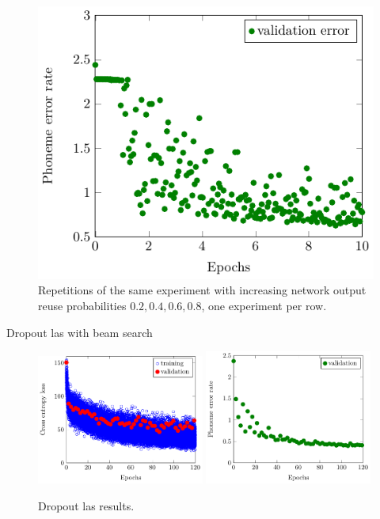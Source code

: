 \documentclass[10pt]{beamer}
\begin{document}
\begin{frame}
\begin{figure}
	\includegraphics[width=0.24\linewidth]{../tikz/LAS_no_reg_e10_p08_error}
	\caption{Repetitions of the same experiment with increasing network output reuse probabilities $0.2, 0.4, 0.6, 0.8$, one experiment per row.}
	\label{fig:lasGreedy2468}
	\end{figure}
\end{frame}

\begin{frame}{Dropout las with beam search}
	\begin{figure}
	\includegraphics[width=0.49\textwidth]{../tikz/LAS_dropout0805_in00_p06_e120_double_loss}
	\includegraphics[width=0.49\textwidth]{../tikz/LAS_dropout0805_in00_p06_e120_double_error}
	\caption{Dropout las results.}
	\end{figure}
\end{frame}
\end{document}
